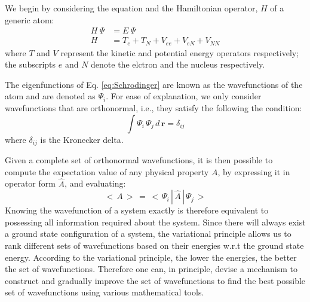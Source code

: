         We begin by considering the \Schrodinger{} equation and the Hamiltonian operator, $H$ of a generic atom:
        \begin{equation}\label{eq:Schrodinger}
            \begin{aligned}
                H~\Psi &= E~\Psi \\
                H &= T_e + T_N + V_{ee} + V_{eN} + V_{NN}
            \end{aligned}
        \end{equation}
        where $T$ and $V$ represent the kinetic and potential energy operators respectively; the subscripts $e$ and $N$ denote the elctron and the nucleus respectively.

        The eigenfunctions of Eq. \eqref{eq:Schrodinger} are known as the wavefunctions of the atom and are denoted as $\Psi_i$. For ease of explanation, we only consider wavefunctions that are orthonormal, i.e., they satisfy the following the condition:
        \begin{equation}\label{eq:orthonormality}
            \int \Psi_i\, \Psi_j\, d\, \mathbf{r} = \delta_{ij}
        \end{equation}
        where $\delta_{ij}$ is the Kronecker delta.

        Given a complete set of orthonormal wavefunctions, it is then possible to compute the expectation value of any physical property $A$, by expressing it in operator form $\hat{A}$, and evaluating:
        \begin{equation}\label{eq:expectation value}
            <\,A\,>\, =\, < \,\Psi_i\,|\,\hat{A}\,|\, \Psi_j\,>
        \end{equation}
        Knowing the wavefunction of a system exactly is therefore equivalent to possessing all information required about the system. Since there will always exist a ground state configuration of a system, the variational principle allows us to rank different sets of wavefunctions based on their energies w.r.t the ground state energy. According to the variational principle, the lower the energies, the better the set of wavefunctions. Therefore one can, in principle, devise a mechanism to construct and gradually improve the set of wavefunctions to find the best possible set of wavefunctions using various mathematical tools.

